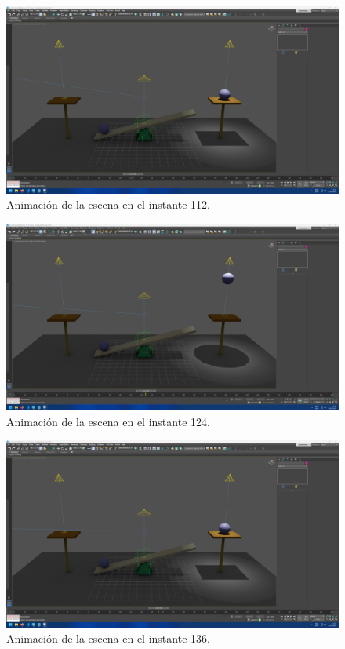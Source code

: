 \documentclass{article}
\begin{document}
 \begin{figure}[H]
    \centering
    \includegraphics[width=\textwidth]{imagenes/animaciones/general/112.png}
    \caption{Animación de la escena en el instante 112.}
 \end{figure}

 \begin{figure}[H]
    \centering
    \includegraphics[width=\textwidth]{imagenes/animaciones/general/124.png}
    \caption{Animación de la escena en el instante 124.}
 \end{figure}

 \begin{figure}[H]
    \centering
    \includegraphics[width=\textwidth]{imagenes/animaciones/general/136.png}
    \caption{Animación de la escena en el instante 136.}
 \end{figure}
\end{document}
